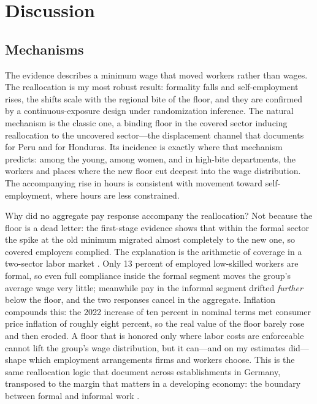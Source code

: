 \section{Discussion}\label{sec:discussion}

\subsection{Mechanisms}

The evidence describes a minimum wage that moved workers rather than wages. The
reallocation is my most robust result: formality falls and self-employment rises, the
shifts scale with the regional bite of the floor, and they are confirmed by a
continuous-exposure design under randomization inference. The natural mechanism is the
classic one, a binding floor in the covered sector inducing reallocation to the uncovered
sector---the displacement channel that \citet{jaramillo_lopez_2006} documents for Peru
and \citet{ham_2018_honduras} for Honduras. Its incidence is exactly where that mechanism
predicts: among the young, among women, and in high-bite departments, the workers and
places where the new floor cut deepest into the wage distribution. The accompanying rise
in hours is consistent with movement toward self-employment, where hours are less
constrained.

Why did no aggregate pay response accompany the reallocation? Not because the floor is
a dead letter: the first-stage evidence shows that within the formal sector the spike
at the old minimum migrated almost completely to the new one, so covered employers
complied. The explanation is the arithmetic of coverage in a two-sector labor market
\citep{ulyssea_2018}. Only 13 percent of employed low-skilled workers are formal, so
even full compliance inside the formal segment moves the group's average wage very
little; meanwhile pay in the informal segment drifted \emph{further} below the floor,
and the two responses cancel in the aggregate. Inflation compounds this: the 2022
increase of ten percent in nominal terms met consumer price inflation of roughly eight
percent, so the real value of the floor barely rose and then eroded. A floor that is
honored only where labor costs are enforceable cannot lift the group's wage
distribution, but it can---and on my estimates did---shape which employment
arrangements firms and workers choose. This is the same reallocation logic that
\citet{dustmann_2022} document across establishments in Germany, transposed to the
margin that matters in a developing economy: the boundary between formal and informal
work \citep{jales_2018}.


